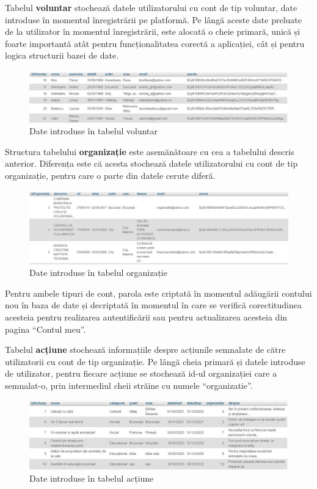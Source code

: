 \documentclass[12pt,a4paper]{report}
\begin{document}
\newpage
Tabelul \textbf{voluntar} stochează datele utilizatorului cu cont de tip voluntar, date introduse în momentul înregistrării pe platformă. Pe lângă aceste date preluate de la utilizator în momentul înregistrării, este alocată o cheie primară, unică și foarte importantă atât pentru funcționalitatea corectă a aplicației, cât și pentru logica structurii bazei de date.
\\
\begin{figure}[H]
\centering
  \includegraphics[width=1\linewidth]{./imagini/voluntar.jpg}
  \caption{Date introduse în tabelul voluntar}
\end{figure}
\par
Structura tabelului \textbf{organizație} este asemănătoare cu cea a tabelului descris anterior. Diferența este că acesta stochează datele utilizatorului cu cont de tip organizație, pentru care o parte din datele cerute diferă.
\\
\begin{figure}[H]
\centering
  \includegraphics[width=1\linewidth]{./imagini/organizatie.jpg}
  \caption{Date introduse în tabelul organizație}
\end{figure}
\par
Pentru ambele tipuri de cont, parola este criptată în momentul adăugării contului nou în baza de date și decriptată în momentul în care se verifică corectitudinea acesteia pentru realizarea autentificării sau pentru actualizarea acesteia din pagina “Contul meu”.

\newpage
Tabelul \textbf{acțiune} stochează informațiile despre acțiunile semnalate de către utilizatorii cu cont de tip organizație. Pe lângă cheia primară și datele introduse de utilizator, pentru fiecare acțiune se stochează id-ul organizației care a semnalat-o, prin intermediul cheii străine cu numele “organizatie”.
\\
\begin{figure}[H]
\centering
  \includegraphics[width=1\linewidth]{./imagini/actiune.jpg}
  \caption{Date introduse în tabelul acțiune}
\end{figure}
\end{document}
